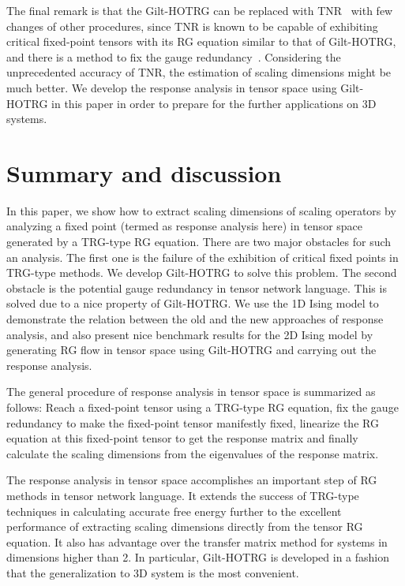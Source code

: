 \documentclass[aps,prb,reprint,superscriptaddress]{revtex4-2}
\begin{document}
The final remark is that the Gilt-HOTRG can be replaced with
TNR~\cite{tnr,tnralgo} with few changes of other procedures, since TNR
is known to be capable of exhibiting critical fixed-point tensors with
its RG equation similar to that of Gilt-HOTRG, and there is a method to
fix the gauge redundancy~\cite{tnralgo}. Considering the unprecedented
accuracy of TNR, the estimation of scaling dimensions might be much
better. We develop the response analysis in tensor space using
Gilt-HOTRG in this paper in order to prepare for the further
applications on 3D systems.
%


\section{Summary and discussion\label{conclusion}}
In this paper, we show how to extract scaling dimensions of scaling
operators by analyzing a fixed point (termed as response analysis
here) in tensor space generated by a TRG-type RG equation. There are two
major obstacles for such an analysis. The first one is the failure of
the exhibition of critical fixed points in TRG-type methods. We develop
Gilt-HOTRG to solve this problem. The second obstacle is the potential
gauge redundancy in tensor network language. This is solved due to a
nice property of Gilt-HOTRG.  We use the 1D Ising model to demonstrate
the relation between the old and the new approaches of response
analysis, and also present nice benchmark results for the 2D Ising model
by generating RG flow in tensor space using Gilt-HOTRG and carrying out
the response analysis. 
%

The general procedure of response analysis in tensor space is summarized
as follows: Reach a fixed-point tensor using a TRG-type RG equation, fix
the gauge redundancy to make the fixed-point tensor manifestly fixed,
linearize the RG equation at this fixed-point tensor to get the response
matrix and finally calculate the scaling dimensions from the
eigenvalues of the response matrix.
%

The response analysis in tensor space accomplishes an important step of
RG methods in tensor network language. It extends the success of
TRG-type techniques in calculating accurate free energy further to
the excellent performance of extracting scaling dimensions directly from
the tensor RG equation. It also has advantage over the transfer matrix
method for systems in dimensions higher than 2. In particular,
Gilt-HOTRG is developed in a fashion that the generalization to 3D
system is the most convenient.
\end{document}
